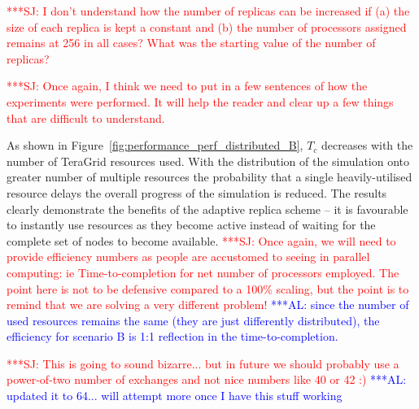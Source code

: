 \documentclass{rspublic}
\newcommand{\alnote}[1]{ {\textcolor{blue} { ***AL: #1 }}}
\newcommand{\jhanote}[1]{ {\textcolor{red} { ***SJ: #1 }}}
\newcommand{\alnote}[1]{}
\newcommand{\jhanote}[1]{}
\begin{document}
\jhanote{I don't understand how the number of replicas can be
  increased if (a) the size of each replica is kept a constant and (b)
  the number of processors assigned remains at 256 in all cases? What
  was the starting value of the number of replicas?}  

\jhanote{Once again, I think we need to put in a few sentences of how
  the experiments were performed. It will help the reader and clear up
  a few things that are difficult to understand.}

As shown in Figure~\ref{fig:performance_perf_distributed_B}, $T_{c}$
decreases with the number of TeraGrid resources used.  With the
distribution of the simulation onto greater number of multiple
resources the probability that a single heavily-utilised resource
delays the overall progress of the simulation is reduced.
The results clearly demonstrate the benefits of the adaptive replica
scheme -- it is favourable to instantly use resources as they become
active instead of waiting for the complete set of nodes to become
available.  \jhanote{Once again, we will need to provide efficiency
  numbers as people are accustomed to seeing in parallel computing: ie
  Time-to-completion for net number of processors employed.  The point
  here is not to be defensive compared to a 100\% scaling, but the
  point is to remind that we are solving a very different problem!}
\alnote{since the number of used resources remains the same (they are
  just differently distributed), the efficiency for scenario B is 1:1
  reflection in the time-to-completion.}

\jhanote{This is going to sound bizarre... but in future we should
  probably use a power-of-two number of exchanges and not nice numbers
  like 40 or 42 :)}           
\alnote{updated it to 64... will attempt more once I have this stuff working}

                                              
\end{document}
